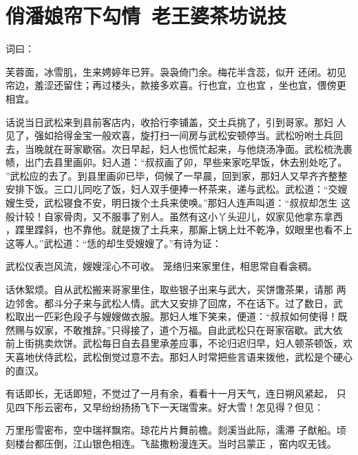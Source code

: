 \chapter{俏潘娘帘下勾情~老王婆茶坊说技}

词曰：

芙蓉面，冰雪肌，生来娉婷年已笄。袅袅倚门余。梅花半含蕊，似开
还闭。初见帘边，羞涩还留住；再过楼头，款接多欢喜。行也宜，立也宜
，坐也宜，偎傍更相宜。

话说当日武松来到县前客店内，收拾行李铺盖，交土兵挑了，引到哥家。那妇
人见了，强如拾得金宝一般欢喜，旋打扫一间房与武松安顿停当。武松吩咐土兵回
去，当晚就在哥家歇宿。次日早起，妇人也慌忙起来，与他烧汤净面。武松梳洗裹
帻，出门去县里画卯。妇人道：“叔叔画了卯，早些来家吃早饭，休去别处吃了。
”武松应的去了。到县里画卯已毕，伺候了一早晨，回到家，那妇人又早齐齐整整
安排下饭。三口儿同吃了饭，妇人双手便捧一杯茶来，递与武松。武松道：“交嫂
嫂生受，武松寝食不安，明日拨个土兵来使唤。”那妇人连声叫道：“叔叔却怎生
这般计较！自家骨肉，又不服事了别人。虽然有这小丫头迎儿，奴家见他拿东拿西
，蹀里蹀斜，也不靠他。就是拨了土兵来，那厮上锅上灶不乾净，奴眼里也看不上
这等人。”武松道：“恁的却生受嫂嫂了。”有诗为证：

武松仪表岂风流，嫂嫂淫心不可收。
笼络归来家里住，相思常自看衾稠。

话休絮烦。自从武松搬来哥家里住，取些银子出来与武大，买饼馓茶果，请那
两边邻舍。都斗分子来与武松人情。武大又安排了回席，不在话下。过了数日，武
松取出一匹彩色段子与嫂嫂做衣服。那妇人堆下笑来，便道：“叔叔如何使得！既
然赐与奴家，不敢推辞。”只得接了，道个万福。自此武松只在哥家宿歇。武大依
前上街挑卖炊饼。武松每日自去县里承差应事，不论归迟归早，妇人顿茶顿饭，欢
天喜地伏侍武松，武松倒觉过意不去。那妇人时常把些言语来拨他，武松是个硬心
的直汉。

有话即长，无话即短，不觉过了一月有余，看看十一月天气，连日朔风紧起，
只见四下彤云密布，又早纷纷扬扬飞下一天瑞雪来。好大雪！怎见得？但见：

万里彤雪密布，空中瑞祥飘帘。琼花片片舞前檐。剡溪当此际，濡滞
子猷船。顷刻楼台都压倒，江山银色相连。飞盐撒粉漫连天。当时吕蒙正
，窑内叹无钱。

